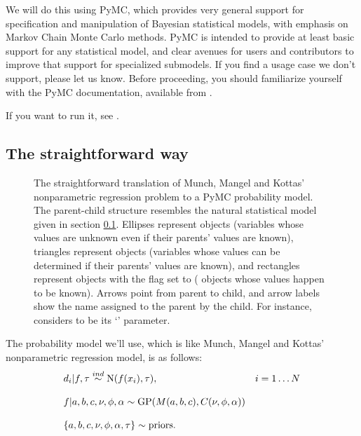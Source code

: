\documentclass{manual}
\begin{document}
We will do this using PyMC, which provides very general support for specification and manipulation of Bayesian statistical models, with emphasis on Markov Chain Monte Carlo methods. PyMC is intended to provide at least basic support for any statistical model, and clear avenues for users and contributors to improve that support for specialized submodels. If you find a usage case we don't support, please let us know. Before proceeding, you should familiarize yourself with the PyMC documentation, available from .

If you want to run it, see . 

\subsection{The straightforward way}\label{sub:straightforwardPyMC}

\begin{figure}
	\centering
	\caption{The straightforward translation of Munch, Mangel and Kottas' nonparametric regression problem to a PyMC probability model. The parent-child structure resembles the natural statistical model given in section \ref{sub:straightforwardPyMC}. Ellipses represent  objects (variables whose values are unknown even if their parents' values are known), triangles represent  objects (variables whose values can be determined if their parents' values are known), and rectangles represent  objects with the  flag set to  ( objects whose values happen to be known). Arrows point from parent to child, and arrow labels show the name assigned to the parent by the child. For instance,  considers  to be its `' parameter.}
	\label{fig:unobservedModel}
\end{figure}

The probability model we'll use, which is like Munch, Mangel and Kottas' nonparametric regression model, is as follows:
\begin{equation}
	\label{eqn:npregression}
	\begin{array}{ll}
		d_i|f,\tau\stackrel{{\tiny ind}}{\sim} \textup N(f(x_i), \tau),&i=1\ldots N\\\\
		f|a,b,c,\nu,\phi,\alpha\sim\textup{GP}(M(a,b,c),C(\nu,\phi,\alpha))&\\\\
		\{a,b,c,\nu,\phi,\alpha,\tau\} \sim \textup{priors}.
	\end{array}
\end{equation}
\end{document}
